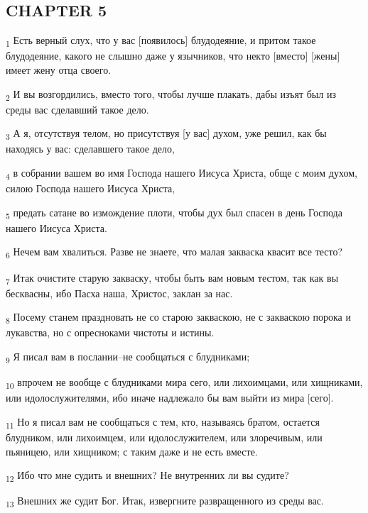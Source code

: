 \subsection{CHAPTER 5}
\begin{tcolorbox}
\textsubscript{1} Есть верный слух, что у вас [появилось] блудодеяние, и притом такое блудодеяние, какого не слышно даже у язычников, что некто [вместо] [жены] имеет жену отца своего.
\end{tcolorbox}
\begin{tcolorbox}
\textsubscript{2} И вы возгордились, вместо того, чтобы лучше плакать, дабы изъят был из среды вас сделавший такое дело.
\end{tcolorbox}
\begin{tcolorbox}
\textsubscript{3} А я, отсутствуя телом, но присутствуя [у вас] духом, уже решил, как бы находясь у вас: сделавшего такое дело,
\end{tcolorbox}
\begin{tcolorbox}
\textsubscript{4} в собрании вашем во имя Господа нашего Иисуса Христа, обще с моим духом, силою Господа нашего Иисуса Христа,
\end{tcolorbox}
\begin{tcolorbox}
\textsubscript{5} предать сатане во измождение плоти, чтобы дух был спасен в день Господа нашего Иисуса Христа.
\end{tcolorbox}
\begin{tcolorbox}
\textsubscript{6} Нечем вам хвалиться. Разве не знаете, что малая закваска квасит все тесто?
\end{tcolorbox}
\begin{tcolorbox}
\textsubscript{7} Итак очистите старую закваску, чтобы быть вам новым тестом, так как вы бесквасны, ибо Пасха наша, Христос, заклан за нас.
\end{tcolorbox}
\begin{tcolorbox}
\textsubscript{8} Посему станем праздновать не со старою закваскою, не с закваскою порока и лукавства, но с опресноками чистоты и истины.
\end{tcolorbox}
\begin{tcolorbox}
\textsubscript{9} Я писал вам в послании--не сообщаться с блудниками;
\end{tcolorbox}
\begin{tcolorbox}
\textsubscript{10} впрочем не вообще с блудниками мира сего, или лихоимцами, или хищниками, или идолослужителями, ибо иначе надлежало бы вам выйти из мира [сего].
\end{tcolorbox}
\begin{tcolorbox}
\textsubscript{11} Но я писал вам не сообщаться с тем, кто, называясь братом, остается блудником, или лихоимцем, или идолослужителем, или злоречивым, или пьяницею, или хищником; с таким даже и не есть вместе.
\end{tcolorbox}
\begin{tcolorbox}
\textsubscript{12} Ибо что мне судить и внешних? Не внутренних ли вы судите?
\end{tcolorbox}
\begin{tcolorbox}
\textsubscript{13} Внешних же судит Бог. Итак, извергните развращенного из среды вас.
\end{tcolorbox}
